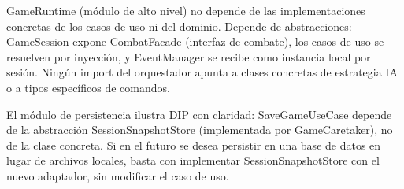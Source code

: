 \documentclass[stu,12pt,floatsintext]{apa7}
\begin{document}
GameRuntime (módulo de alto nivel) no depende de las implementaciones concretas de los casos de uso ni del dominio. Depende de abstracciones: GameSession expone CombatFacade (interfaz de combate), los casos de uso se resuelven por inyección, y EventManager se recibe como instancia local por sesión. Ningún import del orquestador apunta a clases concretas de estrategia IA o a tipos específicos de comandos.

El módulo de persistencia ilustra DIP con claridad: SaveGameUseCase depende de la abstracción SessionSnapshotStore (implementada por GameCaretaker), no de la clase concreta. Si en el futuro se desea persistir en una base de datos en lugar de archivos locales, basta con implementar SessionSnapshotStore con el nuevo adaptador, sin modificar el caso de uso.


\newpage
\end{document}

